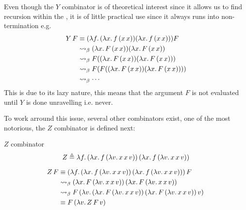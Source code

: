 \documentclass[12pt]{book}
\begin{document}
\begin{remark}
  Even though the $Y$ combinator is of theoretical interest since it allows us to find recursion within the \lcalc, it is of little practical use since it always runs into non-termination e.g.
  \[
    \begin{aligned}
      Y \, F &\equiv (\lambda f. \, (\lambda x . \, f \, (x \, x))(\lambda x . \, f \, (x \, x))) F \\
      &\mathrel{\leadsto}_\beta (\lambda x . \, F \, (x \, x))(\lambda x . \, F \, (x \, x)) \\
             &\mathrel{\leadsto}_\beta F((\lambda x . \, F \, (x \, x))(\lambda x . \, F \, (x \, x))) \\
             &\mathrel{\leadsto}_\beta F(F((\lambda x . \, F \, (x \, x))(\lambda x . \, F \, (x \, x)))) \\
             &\mathrel{\leadsto}_\beta \cdots
    \end{aligned}
  \]
  This is due to its lazy nature, this means that the argument $F$ is not evaluated until $Y$ is done unravelling i.e. never.
\end{remark}
To work arround this issue, several other combinators exist, one of the most notorious, the $Z$ combinator is defined next:
\begin{definition} $Z$ combinator
\[
  Z \triangleq \lambda f.\, (\lambda x.\, f\, (\lambda v.\, x\, x\, v))\, (\lambda x.\, f\, (\lambda v.\, x\, x\, v))
\]
\end{definition}
\begin{example}
  \[
    \begin{aligned}
      Z \, F &\equiv (\lambda f.\, (\lambda x.\, f\, (\lambda v.\, x\, x\, v))\, (\lambda x.\, f\, (\lambda v.\, x\, x\, v)))\, F \\
             &\mathrel{\leadsto}_\beta (\lambda x.\, F\, (\lambda v.\, x\, x\, v))\, (\lambda x.\, F\, (\lambda v.\, x\, x\, v)) \\
             &\mathrel{\leadsto}_\beta F\, (\lambda v.\, (\lambda x.\, F\, (\lambda v.\, x\, x\, v))\, (\lambda x.\, F\, (\lambda v.\, x\, x\, v))\, v)\, \\
             &\equiv F\, (\lambda v.\, Z \, F \, v)\, \\
    \end{aligned}
  \]
\end{example}
  














\newpage
\end{document}
